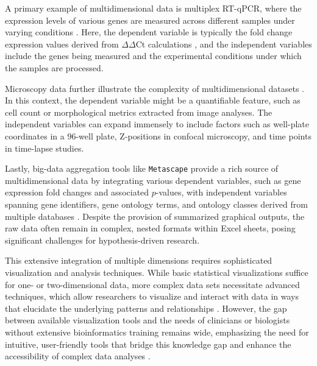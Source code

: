 
A primary example of multidimensional data is multiplex RT-qPCR, where the
expression levels of various genes are measured across different samples under
varying conditions \cite{bustinReproducibilityBiomedicalResearch2014}. Here, the
dependent variable is typically the fold change expression values derived from
$\Delta\Delta$Ct calculations
\cite{brankatschkSimpleAbsoluteQuantification2012}, and the independent
variables include the genes being measured and the experimental conditions under
which the samples are processed.

Microscopy data further illustrate the complexity of multidimensional datasets
\cite{ruedenImageJ2ImageJNext2017}. In this context, the dependent variable
might be a quantifiable feature, such as cell count or morphological metrics
extracted from image analyses. The independent variables can expand immensely to
include factors such as well-plate coordinates in a 96-well plate, Z-positions
in confocal microscopy, and time points in time-lapse studies.

Lastly, big-data aggregation tools like \texttt{Metascape} provide a rich source
of multidimensional data by integrating various dependent variables, such as
gene expression fold changes and associated $p$-values, with independent variables
spanning gene identifiers, gene ontology terms, and ontology classes derived from
multiple databases \cite{zhouMetascapeProvidesBiologistoriented2019}. Despite
the provision of summarized graphical outputs, the raw data often remain in
complex, nested formats within Excel sheets, posing significant challenges for
hypothesis-driven research.

This extensive integration of multiple dimensions requires sophisticated
visualization and analysis techniques. While basic statistical visualizations
suffice for one- or two-dimensional data, more complex data sets necessitate
advanced techniques, which allow researchers to visualize and interact with data
in ways that elucidate the underlying patterns and relationships
\cite{dunnExploringVisualizingMultidimensional2017}. However, the gap between
available visualization tools and the needs of clinicians or biologists without
extensive bioinformatics training remains wide, emphasizing the need for
intuitive, user-friendly tools that bridge this knowledge gap and enhance the
accessibility of complex data analyses
\cite{dunnExploringVisualizingMultidimensional2017}.




